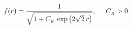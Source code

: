\begin{equation}
f(r)=\frac{1}{\sqrt{1+C_{_{B}}\,\exp \left( 2\sqrt{2}\,r\right)
}}, \hspace{5mm}C_{_{B}}>0  \label{Bog}
\end{equation}

